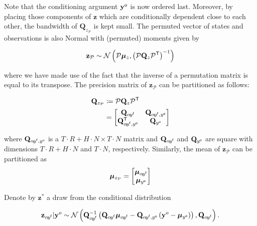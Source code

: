 \documentclass[notitlepage,a4paper,12pt]{article}
\newcommand{\transpose}[1]{{#1}^{\sf{T}}}
\begin{document}
Note that the conditioning argument $\mathbf{y}^{\sf{o}}$ is now ordered last. Moreover, by placing those components of $\mathbf{z}$ which are conditionally dependent close to each other, the bandwidth of $\mathbf{Q}_{z_{\mathcal{P}}}$ is kept small. The permuted vector of states and observations is also Normal with (permuted) moments given by 

\begin{equation*}
    \mathbf{z_{\mathcal{P}}} \sim \mathcal{N}\left(\mathcal{P}\boldsymbol{\mu}_z, \left(\mathcal{P} \mathbf{Q}_z \transpose{\mathcal{P}}\right)^{-1}\right)
\end{equation*}

where we have made use of the fact that the inverse of a permutation matrix is equal to its transpose.  The precision matrix of $\mathbf{z}_{\mathcal{P}}$ can be partitioned as follows: 

\begin{align*}
    \mathbf{Q}_{z_{\mathcal{P}}} &\coloneqq  \mathcal{P} \mathbf{Q}_z \transpose{\mathcal{P}} \\
    &= 
    \begin{bmatrix}
        \mathbf{Q}_{\alpha\! y^{\sf{f}}} & \mathbf{Q}_{\alpha\! y^{\sf{f}}, y^{\sf{o}}} \\ 
        \mathbf{Q}^{\sf{T}}_{\alpha\! y^{\sf{f}}, y^{\sf{o}}} & \mathbf{Q}_{y^{\sf{o}}}
    \end{bmatrix}
\end{align*}

where $\mathbf{Q}_{\alpha\! y^{\sf{f}}, y^{\sf{o}}}$ is a 
$T\!\cdot\!R + H\!\cdot\!N \times T\!\cdot\!N$ matrix and $\mathbf{Q}_{\alpha\! y^{\sf{f}}}$ and $\mathbf{Q}_{y^{\sf{o}}}$ are square with dimensions $T\!\cdot\!R + H\!\cdot\!N$ and $T\!\cdot\!N $, respectively. Similarly, the mean of $\mathbf{z}_{\mathcal{P}}$ can be partitioned as 
$$
\boldsymbol{\mu}_{z_{\mathcal{P}}} = 
\begin{bmatrix}
    \boldsymbol{\mu}_{\alpha\! y^{\sf{f}}} \\
    \boldsymbol{\mu}_{y^{\sf{o}}}
\end{bmatrix}
$$

Denote by $\mathbf{z}^*$ a draw from the conditional distribution 

\begin{equation*}
    \mathbf{z}_{\alpha\! y^{\sf{f}}} | \mathbf{y}^{o} \sim 
    \mathcal{N}\left(
        \mathbf{Q}^{-1}_{\alpha\! y^{\sf{f}}}\left( \mathbf{Q}_{\alpha\! y^{\sf{f}}}\boldsymbol{\mu}_{\alpha\! y^{\sf{f}}} - \mathbf{Q}_{\alpha\! y^{\sf{f}}, y^{\sf{o}}}\left(\mathbf{y}^o-\boldsymbol{\mu}_{y^{\sf{o}}}\right)\right)
    ,
    \mathbf{Q}_{\alpha\! y^{\sf{f}}}
    \right).
\end{equation*}
\end{document}
